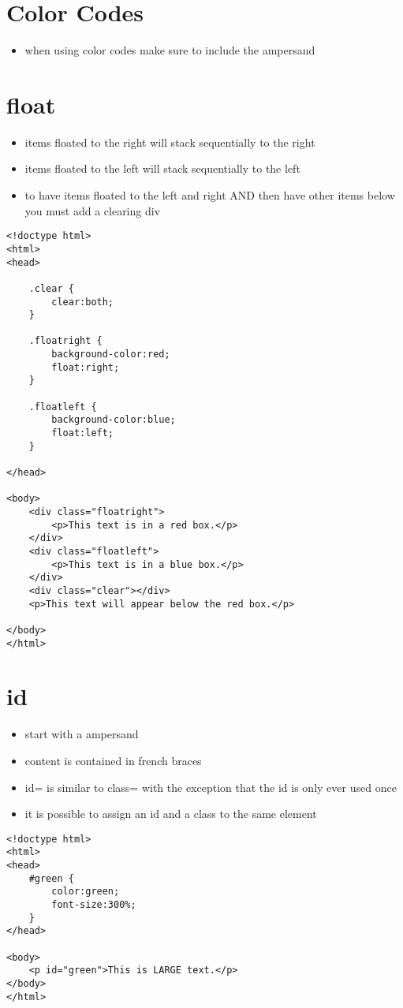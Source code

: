 \documentclass{article}
\begin{document}
\section{Color Codes}
\begin{itemize}
  \item when using color codes make sure to include the ampersand
\end{itemize}

\section{float}
\begin{itemize}
  \item items floated to the right will stack sequentially to the right
  \item items floated to the left will stack sequentially to the left
  \item to have items floated to the left and right AND then have other items
    below you must add a clearing div
\end{itemize}
\begin{lstlisting}
<!doctype html>
<html>
<head>

    .clear {
        clear:both;
    }

    .floatright {
        background-color:red;
        float:right;
    }

    .floatleft {
        background-color:blue;
        float:left;
    }

</head>

<body>
    <div class="floatright">
        <p>This text is in a red box.</p>
    </div>
    <div class="floatleft">
        <p>This text is in a blue box.</p>
    </div>
    <div class="clear"></div>
    <p>This text will appear below the red box.</p>

</body>
</html>
\end{lstlisting}


\section{id}
\begin{itemize}
  \item start with a ampersand
  \item content is contained in french braces
  \item id= is similar to class= with the exception that the id is only ever
    used once
  \item it is possible to assign an id and a class to the same element
\end{itemize}
\begin{lstlisting}
<!doctype html>
<html>
<head>
    #green {
        color:green;
        font-size:300%;
    }
</head>

<body>
    <p id="green">This is LARGE text.</p>
</body>
</html>
\end{lstlisting}
\end{document}
